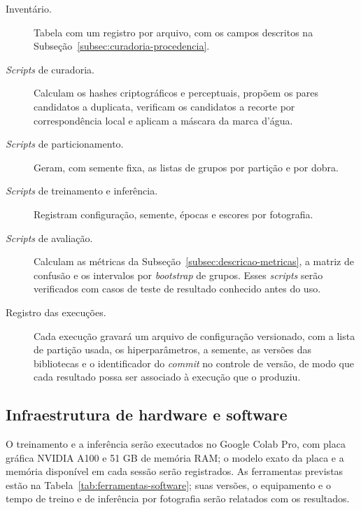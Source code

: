 \begin{description}
	\item[Inventário.] Tabela com um registro por arquivo, com os campos
	      descritos na Subseção~\ref{subsec:curadoria-procedencia}.
	\item[\textit{Scripts} de curadoria.] Calculam os hashes criptográficos e
	      perceptuais, propõem os pares candidatos a duplicata, verificam os
	      candidatos a recorte por correspondência local e aplicam a máscara
	      da marca d'água.
	\item[\textit{Scripts} de particionamento.] Geram, com semente fixa, as
	      listas de grupos por partição e por dobra.
	\item[\textit{Scripts} de treinamento e inferência.] Registram
	      configuração, semente, épocas e escores por fotografia.
	\item[\textit{Scripts} de avaliação.] Calculam as métricas da
	      Subseção~\ref{subsec:descricao-metricas}, a matriz de
	      confusão e os intervalos por \textit{bootstrap} de grupos. Esses \textit{scripts}
	      serão verificados com casos de teste de resultado conhecido antes
	      do uso.
	\item[Registro das execuções.] Cada execução gravará um arquivo de
	      configuração versionado, com a lista de partição usada, os
	      hiperparâmetros, a semente, as versões das bibliotecas e o
	      identificador do \textit{commit} no controle de versão, de modo que
	      cada resultado possa ser associado à execução que o produziu.
\end{description}

\subsection{Infraestrutura de hardware e software}
\label{subsec:infraestrutura}

O treinamento e a inferência serão executados no Google Colab Pro, com
placa gráfica NVIDIA A100 e 51 GB de memória RAM; o modelo exato da placa e
a memória disponível em cada sessão serão registrados. As ferramentas
previstas estão na Tabela~\ref{tab:ferramentas-software}; suas versões, o
equipamento e o tempo de treino e de inferência por fotografia serão
relatados com os resultados.

